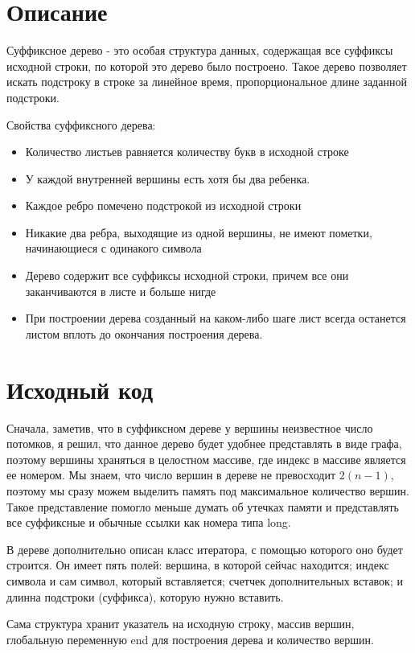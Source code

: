 \section{Описание}

Суффиксное дерево - это особая структура данных, содержащая все суффиксы исходной строки, по которой это дерево было построено. Такое дерево позволяет искать подстроку в строке за
линейное время, пропорциональное длине заданной подстроки.

Свойства суффиксного дерева:
\begin {itemize}
  \item Количество листьев равняется количеству букв в исходной строке
  \item У каждой внутренней вершины есть хотя бы два ребенка.
  \item Каждое ребро помечено подстрокой из исходной строки
  \item Никакие два ребра, выходящие из одной вершины, не имеют пометки, начинающиеся с одинакого символа
  \item Дерево содержит все суффиксы исходной строки, причем все они заканчиваются в листе и больше нигде
  \item При построении дерева созданный на каком-либо шаге лист всегда останется листом вплоть до окончания построения дерева.
\end{itemize}

\pagebreak
\section{Исходный код}

Сначала, заметив, что в суффиксном дереве у вершины неизвестное число потомков, я решил, что данное дерево будет удобнее представлять в виде графа, поэтому вершины храняться в целостном массиве, где индекс в массиве является ее номером. Мы знаем, что число вершин в дереве не превосходит $2(n-1)$, поэтому мы сразу можем выделить память под максимальное количество вершин. Такое представление помогло меньше думать об утечках памяти и представлять все суффиксные и обычные ссылки как номера типа long. 

В дереве дополнительно описан класс итератора, с помощью которого оно будет строится. Он имеет пять полей: вершина, в которой сейчас находится; индекс символа и сам символ, который вставляется; счетчек дополнительных вставок; и длинна подстроки (суффикса), которую нужно вставить.

Сама структура хранит указатель на исходную строку, массив вершин, глобальную переменную end для построения дерева и количество вершин. 

